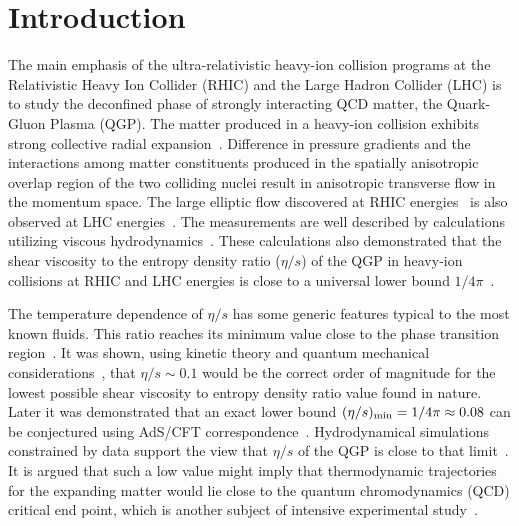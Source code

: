 
\section{Introduction}
\label{sec:intro}
The main emphasis of the ultra-relativistic heavy-ion collision programs at the Relativistic Heavy Ion Collider (RHIC) and the Large Hadron Collider (LHC) is to study the deconfined phase of strongly interacting QCD matter, the Quark-Gluon Plasma (QGP). 
The matter produced in a heavy-ion collision exhibits strong collective radial expansion~\cite{PhysRevD.34.794,Heinz:2013th}. 
Difference in pressure gradients and the interactions among matter constituents produced in the spatially anisotropic overlap region of the two colliding nuclei result in anisotropic transverse flow in the momentum space.
The large elliptic flow discovered at RHIC energies~\cite{Ackermann:2000tr,Adams:2005dq,Adcox:2004mh,Arsene:2004fa,Back:2004je} is also observed at LHC energies~\cite{Aamodt:2010pa,ALICE:2011ab,Abelev:2014pua,Adam:2016izf,ATLAS:2011ah,ATLAS:2012at,Aad:2013xma,Aad:2014eoa,Chatrchyan:2012wg,Chatrchyan:2012ta,Chatrchyan:2012xq}. The measurements are well described by calculations utilizing viscous hydrodynamics~\cite{Romatschke:2007mq,Shen:2011eg,Schenke:2011zz,Bozek:2012qs,Gale:2012rq,Hirano:2010je}.
These calculations also demonstrated that the shear viscosity to the entropy density ratio ($\eta/s$) of the QGP in heavy-ion collisions at RHIC and LHC energies is close to a universal lower bound $1/4\pi$~\cite{Kovtun:2004de}.

The temperature dependence of $\eta/s$ has some generic features typical to the most known fluids. This ratio reaches its minimum value close to the phase transition region~\cite{Kovtun:2004de,Lacey:2006bc}.
It was shown, using kinetic theory and quantum mechanical considerations~\cite{PhysRevD.31.53}, that $\eta/s\sim0.1$ would be the correct order of magnitude for the lowest possible shear viscosity to entropy density ratio value found in nature. Later it was demonstrated that an exact lower bound $(\eta/s)_{\rm min}=1/4\pi\approx0.08$ can be conjectured using AdS/CFT correspondence~\cite{Kovtun:2004de}. Hydrodynamical simulations constrained by data support the view that $\eta/s$ of the QGP is close to that limit~\cite{Gale:2012rq}.
It is argued that such a low value might imply that thermodynamic trajectories for the expanding matter would lie close to the quantum chromodynamics (QCD) critical end point, which is another subject of intensive experimental study~\cite{Lacey:2006bc,Csernai:2006zz}.

